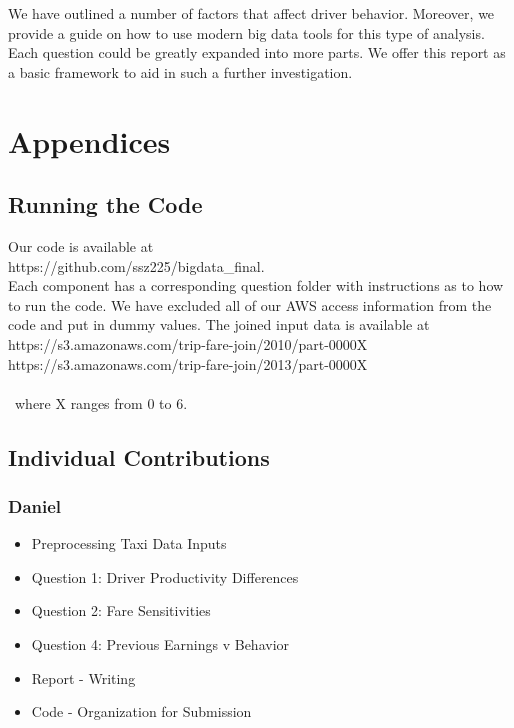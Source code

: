 \documentclass[twoside]{article}
\begin{document}
\begin{multicols}{2}
We have outlined a number of factors that affect driver behavior. Moreover, we provide a guide on how to use modern big data tools for this type of analysis. Each question could be greatly expanded into more parts. We offer this report as a basic framework to aid in such a further investigation. 






\section{Appendices}

\subsection{Running the Code}

Our code is available at \\

\noindent https://github.com/ssz225/bigdata\_final.\\

\noindent Each component has a corresponding question folder with instructions as to how to run the code. We have excluded all of our AWS access information from the code and put in dummy values.  The joined input data is available at \\

\noindent https://s3.amazonaws.com/trip-fare-join/2010/part-0000X\\
\noindent https://s3.amazonaws.com/trip-fare-join/2013/part-0000X
\\\\\
where X ranges from 0 to 6.

\subsection{Individual Contributions}
\subsubsection*{Daniel}
\begin{itemize}
  \item Preprocessing Taxi Data Inputs
  \item Question 1: Driver Productivity Differences
  \item Question 2: Fare Sensitivities
  \item Question 4: Previous Earnings v Behavior
  \item Report - Writing
  \item Code - Organization for Submission
\end{itemize}



\end{multicols}
\end{document}
